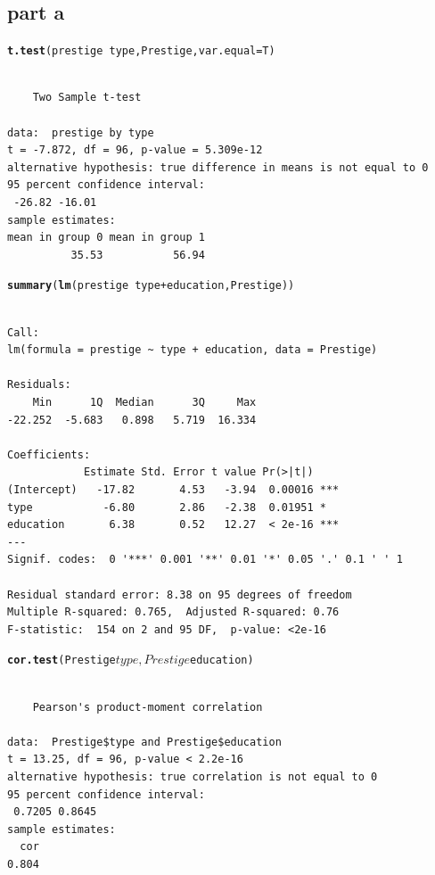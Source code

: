 \documentclass{article}\usepackage{graphicx, color}
\makeatletter
\newcommand{\hlfunctioncall}[1]{\textcolor[rgb]{0.501960784313725,0,0.329411764705882}{\textbf{#1}}}%
\newenvironment{kframe}{%
 \def\at@end@of@kframe{}%
 \ifinner\ifhmode%
  \def\at@end@of@kframe{\end{minipage}}%
  \begin{minipage}{\columnwidth}%
 \fi\fi%
 \def\FrameCommand##1{\hskip\@totalleftmargin \hskip-\fboxsep
 \colorbox{shadecolor}{##1}\hskip-\fboxsep
     \hskip-\linewidth \hskip-\@totalleftmargin \hskip\columnwidth}%
 \MakeFramed {\advance\hsize-\width
   \@totalleftmargin\z@ \linewidth\hsize
   \@setminipage}}%
 {\par\unskip\endMakeFramed%
 \at@end@of@kframe}
\newenvironment{knitrout}{}{} %
\makeatother
\begin{document}
\subsection*{part a}
\begin{knitrout}
\color{fgcolor}\begin{kframe}
\begin{alltt}
\hlfunctioncall{t.test}(prestige~type, Prestige, var.equal=T)
\end{alltt}
\begin{verbatim}

	Two Sample t-test

data:  prestige by type 
t = -7.872, df = 96, p-value = 5.309e-12
alternative hypothesis: true difference in means is not equal to 0 
95 percent confidence interval:
 -26.82 -16.01 
sample estimates:
mean in group 0 mean in group 1 
          35.53           56.94 

\end{verbatim}
\begin{alltt}
\hlfunctioncall{summary}(\hlfunctioncall{lm}(prestige~type+education, Prestige))
\end{alltt}
\begin{verbatim}

Call:
lm(formula = prestige ~ type + education, data = Prestige)

Residuals:
    Min      1Q  Median      3Q     Max 
-22.252  -5.683   0.898   5.719  16.334 

Coefficients:
            Estimate Std. Error t value Pr(>|t|)    
(Intercept)   -17.82       4.53   -3.94  0.00016 ***
type           -6.80       2.86   -2.38  0.01951 *  
education       6.38       0.52   12.27  < 2e-16 ***
---
Signif. codes:  0 '***' 0.001 '**' 0.01 '*' 0.05 '.' 0.1 ' ' 1 

Residual standard error: 8.38 on 95 degrees of freedom
Multiple R-squared: 0.765,	Adjusted R-squared: 0.76 
F-statistic:  154 on 2 and 95 DF,  p-value: <2e-16 

\end{verbatim}
\begin{alltt}
\hlfunctioncall{cor.test}(Prestige$type,Prestige$education)
\end{alltt}
\begin{verbatim}

	Pearson's product-moment correlation

data:  Prestige$type and Prestige$education 
t = 13.25, df = 96, p-value < 2.2e-16
alternative hypothesis: true correlation is not equal to 0 
95 percent confidence interval:
 0.7205 0.8645 
sample estimates:
  cor 
0.804 

\end{verbatim}
\end{kframe}
\end{knitrout}
\end{document}
